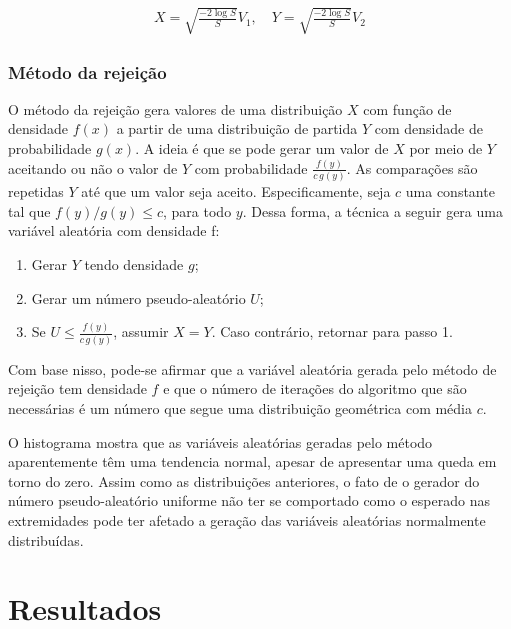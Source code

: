 \documentclass[
]{article}
\providecommand{\tightlist}{%
  \setlength{\itemsep}{0pt}\setlength{\parskip}{0pt}}
\begin{document}
\begin{align}
  X = \sqrt{\frac{-2 \log S}{S}}V_1, \quad Y = \sqrt{\frac{-2 \log S}{S}}V_2
\end{align}

\hypertarget{muxe9todo-da-rejeiuxe7uxe3o}{%
\subsubsection{Método da rejeição}\label{muxe9todo-da-rejeiuxe7uxe3o}}

O método da rejeição gera valores de uma distribuição \(X\) com função
de densidade \(f(x)\) a partir de uma distribuição de partida \(Y\) com
densidade de probabilidade \(g(x)\). A ideia é que se pode gerar um
valor de \(X\) por meio de \(Y\) aceitando ou não o valor de \(Y\) com
probabilidade \(\frac{f(y)}{c \, g(y)}\). As comparações são repetidas
\(Y\) até que um valor seja aceito. Especificamente, seja \(c\) uma
constante tal que \(f(y)/g(y) \leq c\), para todo \(y\). Dessa forma, a
técnica a seguir gera uma variável aleatória com densidade f:

\begin{enumerate}
\def\labelenumi{\arabic{enumi}.}
\tightlist
\item
  Gerar \(Y\) tendo densidade \(g\);
\item
  Gerar um número pseudo-aleatório \(U\);
\item
  Se \(U \leq \frac{f(y)}{c\, g(y)}\), assumir \(X = Y\). Caso
  contrário, retornar para passo 1.
\end{enumerate}

Com base nisso, pode-se afirmar que a variável aleatória gerada pelo
método de rejeição tem densidade \(f\) e que o número de iterações do
algoritmo que são necessárias é um número que segue uma distribuição
geométrica com média \(c\).

O histograma mostra que as variáveis aleatórias geradas pelo método
aparentemente têm uma tendencia normal, apesar de apresentar uma queda
em torno do zero. Assim como as distribuições anteriores, o fato de o
gerador do número pseudo-aleatório uniforme não ter se comportado como o
esperado nas extremidades pode ter afetado a geração das variáveis
aleatórias normalmente distribuídas.

\hypertarget{resultados}{%
\section{Resultados}\label{resultados}}
\end{document}
